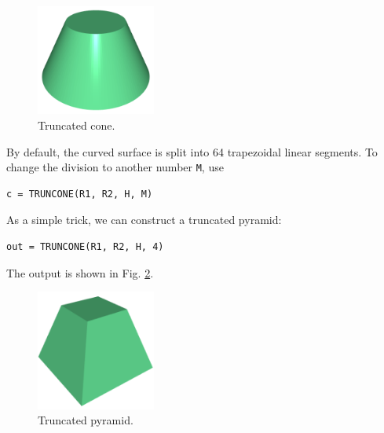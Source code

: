 \begin{figure}[!ht]
\begin{center}
\includegraphics[width=0.35\textwidth]{img/tcone-8.png}
\end{center}
\vspace{-6mm}
\caption{Truncated cone.}
\label{fig:tcone}
\end{figure}
\noindent
By default, the curved surface is split into 64 trapezoidal linear segments. 
To change the division to another number {\tt M}, use\\

\begin{bbox}
\begin{verbatim}
c = TRUNCONE(R1, R2, H, M)
\end{verbatim}
\end{bbox}
\vspace{6mm}

\noindent
As a simple trick, we can construct a truncated pyramid:\\

\begin{bbox}
\begin{verbatim}
out = TRUNCONE(R1, R2, H, 4)
\end{verbatim}
\end{bbox}
\vspace{6mm}

\noindent
The output is shown in Fig. \ref{fig:tcone-9}.

\begin{figure}[!ht]
\begin{center}
\includegraphics[width=0.35\textwidth]{img/tcone-9.png}
\end{center}
\vspace{-6mm}
\caption{Truncated pyramid.}
\label{fig:tcone-9}
\end{figure}


